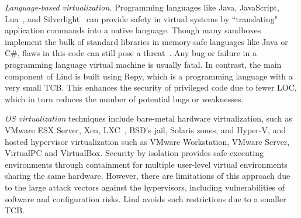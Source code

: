 \textit{Language-based virtualization.}
Programming languages like Java, JavaScript, Lua~\cite{Lua}, and
Silverlight~\cite{Silverlight} can provide safety in virtual systems by
``translating" application commands into a native language.
%
Though many sandboxes implement the bulk of standard libraries in
memory-safe languages like Java or C\#, flaws in this code can
still pose a threat~\cite{JavaBugs, Java-Lessons}.
Any bug or failure in a programming language virtual
machine is usually fatal. In contrast, the main component of Lind
is built using Repy, which is a programming language with a very small TCB.
This enhances the security of privileged code due to fewer LOC,  which in
turn reduces the number of potential bugs or weaknesses.

\textit{OS virtualization}
techniques include
bare-metal hardware virtualization, such as VMware ESX Server, Xen,
LXC~\cite{LXC}, BSD's jail, Solaris zones, and Hyper-V, and
hosted hypervisor virtualization such as VMware
Workstation, VMware Server, VirtualPC and VirtualBox.
Security by isolation \cite{Qubes, Overshadow, SecureVM, HypSec}
provides safe executing environments through containment for multiple
user-level virtual environments sharing the same hardware.
However, there are limitations of this approach due to
the large attack vectors against the hypervisors, including
vulnerabilities of software and configuration risks. Lind avoids such restrictions due to a smaller TCB.


